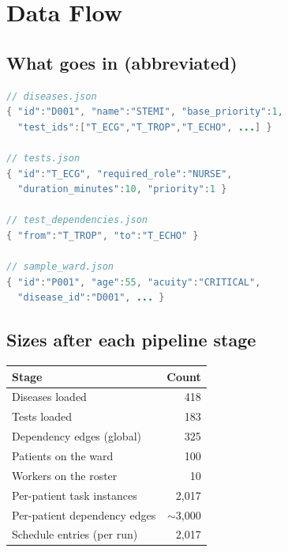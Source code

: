 \section{Data Flow}
\label{sec:dataflow}

\subsection{What goes in (abbreviated)}

\begin{lstlisting}[language=Java,basicstyle=\ttfamily\small,
                   numbers=none,frame=single,backgroundcolor=\color{boxbg},
                   caption={JSON shape excerpts.},captionpos=b]
// diseases.json
{ "id":"D001", "name":"STEMI", "base_priority":1,
  "test_ids":["T_ECG","T_TROP","T_ECHO", ...] }

// tests.json
{ "id":"T_ECG", "required_role":"NURSE",
  "duration_minutes":10, "priority":1 }

// test_dependencies.json
{ "from":"T_TROP", "to":"T_ECHO" }

// sample_ward.json
{ "id":"P001", "age":55, "acuity":"CRITICAL",
  "disease_id":"D001", ... }
\end{lstlisting}

\subsection{Sizes after each pipeline stage}

\begin{table}[H]
\centering
\small
\begin{tabular}{l r}
\toprule
\textbf{Stage} & \textbf{Count} \\
\midrule
Diseases loaded                 & 418 \\
Tests loaded                    & 183 \\
Dependency edges (global)       & 325 \\
Patients on the ward            & 100 \\
Workers on the roster           & 10 \\
Per-patient task instances      & 2{,}017 \\
Per-patient dependency edges    & $\sim$3{,}000 \\
Schedule entries (per run)      & 2{,}017 \\
\bottomrule
\end{tabular}
\end{table}

